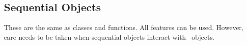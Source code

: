 \subsection{Sequential Objects}

These are the same as \CC{} classes and functions.  All \CC{} features can
be used.  However, care needs to be taken when sequential objects
interact with \charmpp\ objects.
